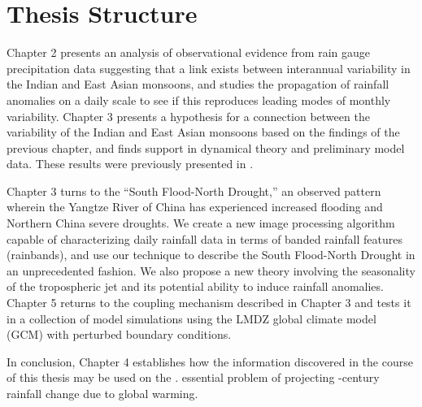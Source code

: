 \section{Thesis Structure}

Chapter 2 presents an analysis of observational evidence from rain gauge precipitation data suggesting that a link exists between interannual variability in the Indian and East Asian monsoons, and studies the propagation of rainfall anomalies on a daily scale to see if this reproduces leading modes of monthly variability. Chapter 3 presents a hypothesis for a connection between the variability of the Indian and East Asian monsoons based on the findings of the previous chapter, and finds support in dynamical theory and preliminary model data. These results were previously presented in \citep{Day2015}.

Chapter 3 turns to the ``South Flood-North Drought,'' an observed pattern wherein the Yangtze River of China has experienced increased flooding and Northern China severe droughts. We create a new image processing algorithm capable of characterizing daily rainfall data in terms of banded rainfall features (rainbands), and use our technique to describe the South Flood-North Drought in an unprecedented fashion. We also propose a new theory involving the seasonality of the tropospheric jet and its potential ability to induce rainfall anomalies. Chapter 5 returns to the coupling mechanism described in Chapter 3 and tests it in a collection of model simulations using the LMDZ global climate model (GCM) with perturbed boundary conditions. 

In conclusion, Chapter 4 establishes how the information discovered in the course of this thesis may be used on the 
 . essential problem of projecting -century rainfall change due to global warming.